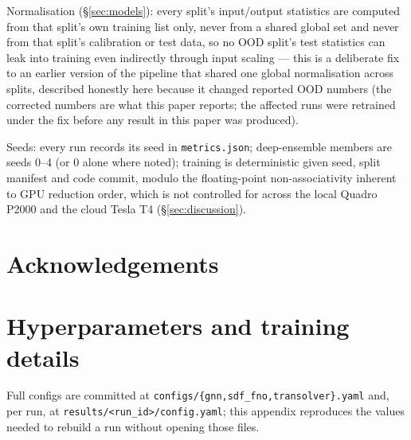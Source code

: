 \documentclass[11pt,a4paper]{article}
\begin{document}
Normalisation (\S\ref{sec:models}): every split's input/output statistics are
computed from that split's own training list only, never from a shared global
set and never from that split's calibration or test data, so no OOD split's
test statistics can leak into training even indirectly through input scaling
--- this is a deliberate fix to an earlier version of the pipeline that shared
one global normalisation across splits, described honestly here because it
changed reported OOD numbers (the corrected numbers are what this paper
reports; the affected runs were retrained under the fix before any result in
this paper was produced).

Seeds: every run records its seed in \texttt{metrics.json}; deep-ensemble
members are seeds 0--4 (or 0 alone where noted); training is deterministic
given seed, split manifest and code commit, modulo the floating-point
non-associativity inherent to GPU reduction order, which is not controlled for
across the local Quadro P2000 and the cloud Tesla T4 (\S\ref{sec:discussion}).

\section*{Acknowledgements}



\appendix

\section{Hyperparameters and training details}
\label{app:hyper}
Full configs are committed at \texttt{configs/\{gnn,sdf\_fno,transolver\}.yaml}
and, per run, at \texttt{results/<run\_id>/config.yaml}; this appendix
reproduces the values needed to rebuild a run without opening those files.
\end{document}
